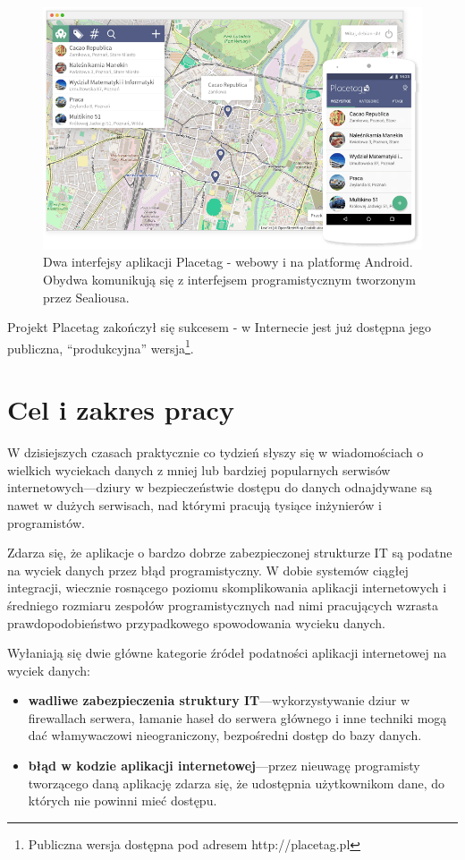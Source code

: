 \documentclass[12pt,polish,a4paper,]{report}
\providecommand{\tightlist}{%
  \setlength{\itemsep}{0pt}\setlength{\parskip}{0pt}}
\begin{document}
\begin{figure}[htbp]
\centering
\includegraphics{./media/placetag.png}
\caption{Dwa interfejsy aplikacji Placetag - webowy i na platformę
Android. Obydwa komunikują się z interfejsem programistycznym tworzonym
przez Sealiousa.}
\end{figure}

Projekt Placetag zakończył się sukcesem - w Internecie jest już dostępna
jego publiczna, ``produkcyjna'' wersja\footnote{Publiczna wersja
  dostępna pod adresem http://placetag.pl}.

\chapter*{Cel i zakres pracy}\label{cel-i-zakres-pracy}

W dzisiejszych czasach praktycznie co tydzień słyszy się w wiadomościach
o wielkich wyciekach danych z mniej lub bardziej popularnych serwisów
internetowych---dziury w bezpieczeństwie dostępu do danych odnajdywane
są nawet w dużych serwisach, nad którymi pracują tysiące inżynierów i
programistów.

Zdarza się, że aplikacje o bardzo dobrze zabezpieczonej strukturze IT są
podatne na wyciek danych przez błąd programistyczny. W dobie systemów
ciągłej integracji, wiecznie rosnącego poziomu skomplikowania aplikacji
internetowych i średniego rozmiaru zespołów programistycznych nad nimi
pracujących wzrasta prawdopodobieństwo przypadkowego spowodowania
wycieku danych.

Wyłaniają się dwie główne kategorie źródeł podatności aplikacji
internetowej na wyciek danych:

\begin{itemize}
\tightlist
\item
  \textbf{wadliwe zabezpieczenia struktury IT}---wykorzystywanie dziur w
  firewallach serwera, łamanie haseł do serwera głównego i inne techniki
  mogą dać włamywaczowi nieograniczony, bezpośredni dostęp do bazy
  danych.
\item
  \textbf{błąd w kodzie aplikacji internetowej}---przez nieuwagę
  programisty tworzącego daną aplikację zdarza się, że udostępnia
  użytkownikom dane, do których nie powinni mieć dostępu.
\end{itemize}
\end{document}
